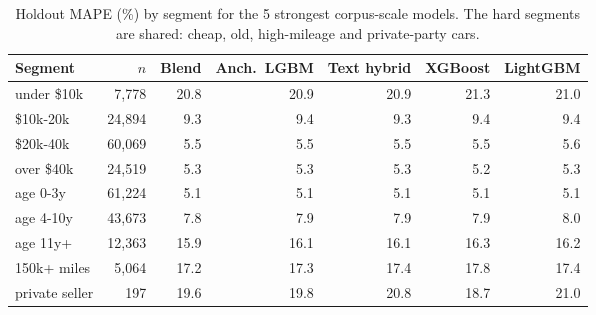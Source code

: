 \begin{table}[t]
\centering
\caption{Holdout MAPE (\%) by segment for the 5 strongest corpus-scale models. The hard segments are shared: cheap, old, high-mileage and private-party cars.}
\label{tab:segments}
\footnotesize\setlength{\tabcolsep}{4pt}
\begin{tabular}{lrrrrrr}
\toprule
Segment & $n$ & Blend & Anch.\ LGBM & Text hybrid & XGBoost & LightGBM \\
\midrule
under \$10k & 7,778 & 20.8 & 20.9 & 20.9 & 21.3 & 21.0 \\
\$10k-20k & 24,894 & 9.3 & 9.4 & 9.3 & 9.4 & 9.4 \\
\$20k-40k & 60,069 & 5.5 & 5.5 & 5.5 & 5.5 & 5.6 \\
over \$40k & 24,519 & 5.3 & 5.3 & 5.3 & 5.2 & 5.3 \\
age 0-3y & 61,224 & 5.1 & 5.1 & 5.1 & 5.1 & 5.1 \\
age 4-10y & 43,673 & 7.8 & 7.9 & 7.9 & 7.9 & 8.0 \\
age 11y+ & 12,363 & 15.9 & 16.1 & 16.1 & 16.3 & 16.2 \\
150k+ miles & 5,064 & 17.2 & 17.3 & 17.4 & 17.8 & 17.4 \\
private seller & 197 & 19.6 & 19.8 & 20.8 & 18.7 & 21.0 \\
\bottomrule
\end{tabular}
\end{table}
